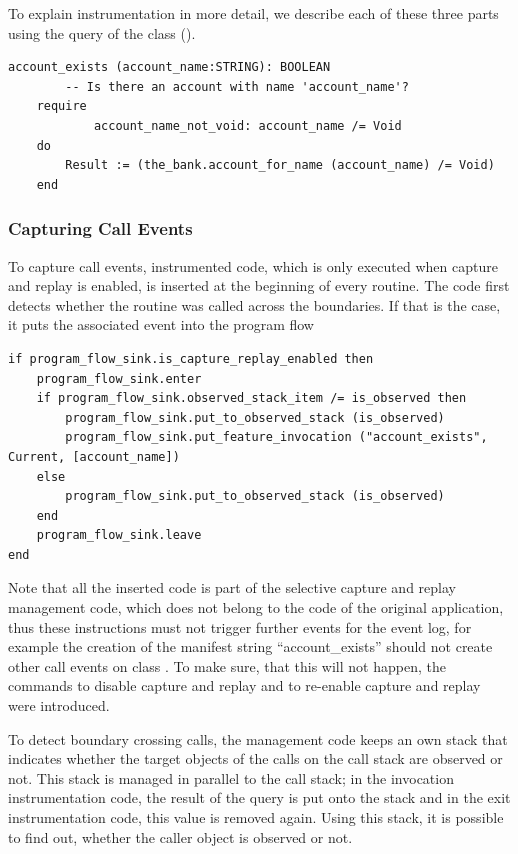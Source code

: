 To explain instrumentation in more detail, we describe each of these three parts using the query  of the class  ().

\begin{lstlisting}[caption=Original Code of Command \feature{account\_exists} ,label=lst:account_exists_original]
account_exists (account_name:STRING): BOOLEAN
		-- Is there an account with name 'account_name'?
	require
			account_name_not_void: account_name /= Void
	do
		Result := (the_bank.account_for_name (account_name) /= Void)
	end
\end{lstlisting}

\subsubsection{Capturing Call Events}
To capture call events, instrumented code, which is only executed when capture and replay is enabled, is inserted at the beginning of every routine. The code first detects whether the routine was called across the boundaries. If that is the case, it puts the associated event into the program flow 
\begin{lstlisting}[caption=Instrumentation Code to Detect Call Events,label=lst:invocation_instrumentation]
if program_flow_sink.is_capture_replay_enabled then
	program_flow_sink.enter
	if program_flow_sink.observed_stack_item /= is_observed then
		program_flow_sink.put_to_observed_stack (is_observed)
		program_flow_sink.put_feature_invocation ("account_exists", Current, [account_name])
	else
		program_flow_sink.put_to_observed_stack (is_observed)
	end
	program_flow_sink.leave
end
\end{lstlisting}
Note that all the inserted code is part of the selective capture and replay management code, which does not belong to the code of the original application, thus these instructions must not trigger further events for the event log, for example the creation of the manifest string ``account\_exists'' should not create other call events on class . To make sure, that this will not happen, the commands  to disable capture and replay and  to re-enable capture and replay were introduced.

To detect boundary crossing calls, the management code keeps an own stack that indicates whether the target objects of the calls on the call stack are observed or not. This stack is managed in parallel to the call stack; in the invocation instrumentation code, the result of the query  is put onto the stack and in the exit instrumentation code, this value is removed again. Using this stack, it is possible to find out, whether the caller object is observed or not.


